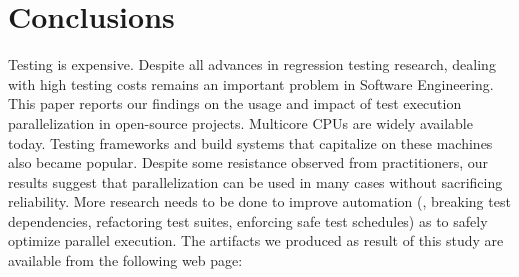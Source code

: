 \section{Conclusions}

Testing is expensive.  Despite all advances in regression testing
research, dealing with high testing costs remains an important problem
in Software Engineering.  This paper reports our findings on the usage
and impact of test execution parallelization in open-source projects.
Multicore CPUs are widely available today.  Testing frameworks and
build systems that capitalize on these machines also became popular.
Despite some resistance observed from practitioners, our results
suggest that parallelization can be used in many cases without
sacrificing reliability. More research needs to be done to improve
automation (\eg{}, breaking test dependencies, refactoring test
suites, enforcing safe test schedules) as to safely optimize parallel
execution.  The artifacts we produced as result of this study are
available from the following web page:

\begin{center}
  \webpage{}
\end{center}  








